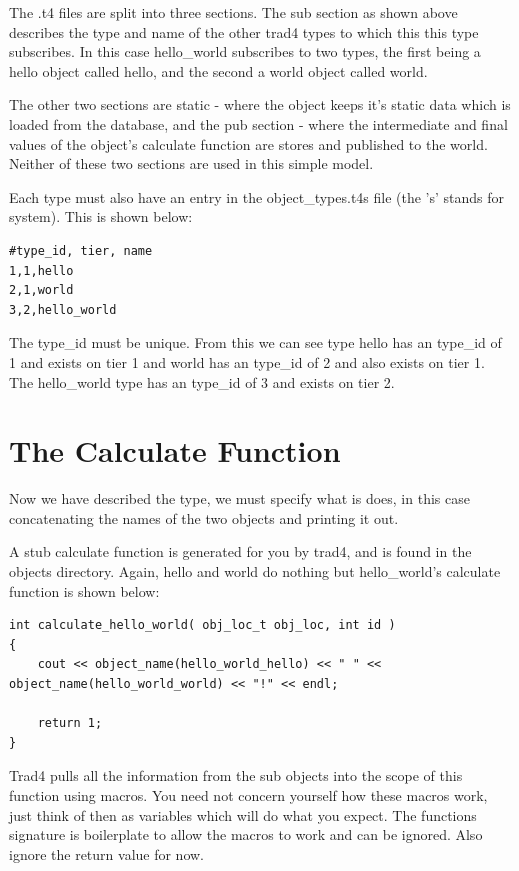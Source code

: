 \documentclass{report}
\begin{document}
The .t4 files are split into three sections. The sub section as shown above describes the type and name of the other trad4 types to which this this type subscribes. In this case hello_world subscribes to two types, the first being a hello object called hello, and the second a world object called world.

The other two sections are static - where the object keeps it's static data which is loaded from the database, and the pub section - where the intermediate and final values of the object's calculate function are stores and published to the world. Neither of these two sections are used in this simple model.

Each type must also have an entry in the object_types.t4s file (the 's' stands for system). This is shown below:

\begin{verbatim}
#type_id, tier, name
1,1,hello
2,1,world
3,2,hello_world
\end{verbatim}


The type_id must be unique. From this we can see type hello has an type_id of 1 and exists on tier 1 and world has an type_id of 2 and also exists on tier 1. The hello_world type has an type_id of 3 and exists on tier 2.

\section{The Calculate Function}

Now we have described the type, we must specify what is does, in this case concatenating the names of the two objects and printing it out.

A stub calculate function is generated for you by trad4, and is found in the objects directory. Again, hello and world do nothing but hello_world's calculate function is shown below:

\begin{verbatim}
int calculate_hello_world( obj_loc_t obj_loc, int id )
{
    cout << object_name(hello_world_hello) << " " << object_name(hello_world_world) << "!" << endl;

    return 1;
}
\end{verbatim}

Trad4 pulls all the information from the sub objects into the scope of this function using macros. You need not concern yourself how these macros work, just think of then as variables which will do what you expect. The functions signature is boilerplate to allow the macros to work and can be ignored. Also ignore the return value for now.
\end{document}
